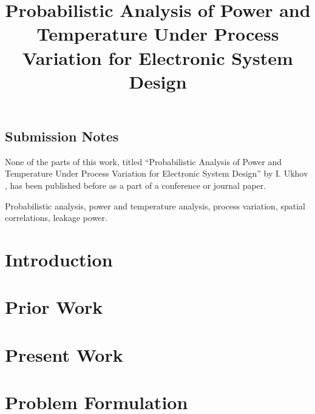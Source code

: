 \documentclass[journal]{IEEEtran}
\begin{document}
  \begin{titlepage}
    \section*{Submission Notes}
    None of the parts of this work, titled ``Probabilistic Analysis of Power and Temperature Under Process Variation for Electronic System Design'' by I. Ukhov \etal, has been published before as a part of a conference or journal paper.
  \end{titlepage}

  \title{\TitleFont Probabilistic Analysis of Power and Temperature Under Process Variation for Electronic System Design}

  \author{
    
  }

  \maketitle

  \begin{abstract}
    
  \end{abstract}

  \begin{IEEEkeywords}
    Probabilistic analysis, power and temperature analysis, process variation, spatial correlations, leakage power.
  \end{IEEEkeywords}

  \section{Introduction} 
  

  \section{Prior Work} 
  

  \section{Present Work} 
  

  \section{Problem Formulation} 
  
\end{document}
